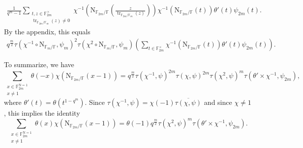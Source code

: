 \documentclass[12pt, reqno]{amsart}
\theoremstyle{definition}
\theoremstyle{definition}
\theoremstyle{definition}
\newcommand{\multiplicativegroup}[1]{#1^{\times}}
\newcommand{\conjugate}[1]{\overline{#1}}
\newcommand{\fieldCharacter}{\psi}
\newcommand{\trace}{\operatorname{tr}}
\newcommand{\aFieldNorm}{\mathrm{N}}
\newcommand{\finiteField}{\mathbb{F}}
\newcommand{\finiteFieldExtension}[1]{\finiteField_{#1}}
\newcommand{\NormOneGroup}[1]{\finiteFieldExtension{#1}^{\aFieldNorm = 1}}
\begin{document}
\begin{align*}
	\frac{1}{q^m-1}\sum_{\substack{t,z \in \multiplicativegroup{\finiteFieldExtension{2m}}\\
			\trace_{\finiteFieldExtension{2m} \slash \finiteFieldExtension{m}}\left(z\right) \ne 0}} \chi^{-1}\left(\aFieldNorm_{\finiteFieldExtension{2m} \slash \finiteField}\left(\frac{z}{\trace_{\finiteFieldExtension{2m} \slash \finiteFieldExtension{m}}\left(z\right) }\right)\right) \chi^{-1}\left(\aFieldNorm_{\finiteFieldExtension{2m} \slash \finiteField}\left(t\right)\right) \theta' \left(t\right) \fieldCharacter_{2m}\left(t\right).
\end{align*}
By the appendix, this equals
\begin{align*}
	q^{\frac{m}{2}} \tau\left(\chi^{-1} \circ \aFieldNorm_{\finiteFieldExtension{m} \slash \finiteField}, \fieldCharacter_m\right)^2 \tau\left(\chi^{2} \circ \aFieldNorm_{\finiteFieldExtension{m} \slash \finiteField}, \fieldCharacter_m\right) \left(\sum_{t \in \multiplicativegroup{\finiteFieldExtension{2m}}} \chi^{-1}\left(\aFieldNorm_{\finiteFieldExtension{2m} \slash \finiteField}\left(t\right)\right) \theta' \left(t\right) \fieldCharacter_{2m}\left(t\right)\right).
\end{align*}

To summarize, we have
$$\sum_{\substack{x \in \NormOneGroup{2m}\\
		x \ne 1}} \theta \left(-x\right) \chi\left(\aFieldNorm_{\finiteFieldExtension{2m} \slash \finiteField}\left(x - 1\right)\right) = q^{\frac{m}{2}} \tau\left(\chi^{-1}, \fieldCharacter\right)^{2m} \tau\left(\chi, \fieldCharacter\right)^{2m} \tau\left(\chi^{2}, \fieldCharacter\right)^m \tau\left(\theta' \times \chi^{-1}, \fieldCharacter_{2m}\right),$$
where $\theta'\left(t\right) = \theta\left(t^{1-q^m}\right)$.
Since $\tau\left(\chi^{-1}, \fieldCharacter\right) = \chi\left(-1\right) \conjugate{\tau\left(\chi, \fieldCharacter\right)}$ and since $\chi \ne 1$, this implies the identity
$$\sum_{\substack{x \in \NormOneGroup{2m}\\
		x \ne 1}} \theta \left(x\right) \chi\left(\aFieldNorm_{\finiteFieldExtension{2m} \slash \finiteField}\left(x - 1\right)\right) = \theta\left(-1\right) q^{\frac{m}{2}} \tau\left(\chi^{2}, \fieldCharacter\right)^m \tau\left(\theta' \times \chi^{-1}, \fieldCharacter_{2m}\right).$$
\end{document}
